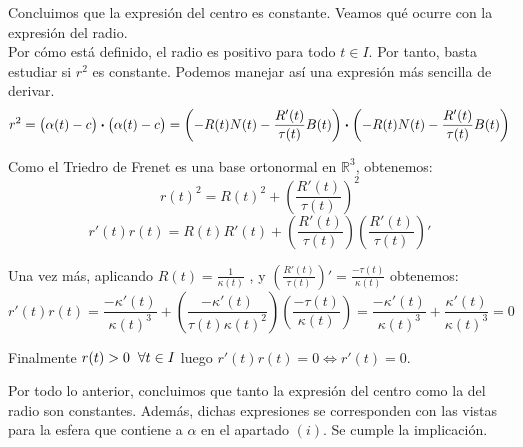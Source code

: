 \documentclass{article}
\begin{document}
\vspace{2mm} \noindent
Concluimos que la expresión del centro es constante.
Veamos qué ocurre con la expresión del radio.\\

Por cómo está definido, el radio es positivo para todo $t \in I$.
Por tanto, basta estudiar si $r^2$ es constante. Podemos manejar así
una expresión más sencilla de derivar.
$$ r^2 = \big{(}\alpha(t) - c\big{)} \boldsymbol{\cdot}\big{(}\alpha(t) - c\big{)}
= \left(-R(t)N(t) - \frac{R'(t)}{\tau(t)}B(t) \right)
\boldsymbol{\cdot} \left(-R(t)N(t) - \frac{R'(t)}{\tau(t)}B(t) \right)$$

\vspace{2mm} \noindent
Como el Triedro de Frenet es una base ortonormal en $\mathbb{R}^3$, obtenemos:
$$r(t)^2 = R(t)^2 + \left(\frac{R'(t)}{\tau(t)}\right)^2$$
$$r'(t)r(t) = R(t)R'(t) + \left(\frac{R'(t)}{\tau(t)}\right)\left(\frac{R'(t)}{\tau(t)}\right)'$$

\newpage \noindent
Una vez más, aplicando $R(t) = \frac{1}{\kappa(t)}$ , y  
$\left(\frac{R'(t)}{\tau(t)}\right)' =\frac{-\tau(t)}{\kappa(t)}$
obtenemos:
$$r'(t)r(t) = \frac{-\kappa'(t)}{\kappa(t)^3}
 + \left(\frac{-\kappa'(t)}{\tau(t)\kappa(t)^2}\right)
    \left(\frac{-\tau(t)}{\kappa(t)}\right)
= \frac{-\kappa'(t)}{\kappa(t)^3} + \frac{\kappa'(t)}{\kappa(t)^3} = 0$$

\vspace{4mm}
\noindent Finalmente $r(t) > 0  \hspace{2mm} \forall t \in I$
luego $r'(t)r(t) = 0 \Leftrightarrow r'(t) = 0$.

\vspace{10mm}
Por todo lo anterior, concluimos que tanto la expresión del centro
como la del radio son constantes. Además, dichas expresiones se corresponden
con las vistas para la esfera que contiene a $\alpha$ en el apartado $(i)$.
Se cumple la implicación.
\end{document}
